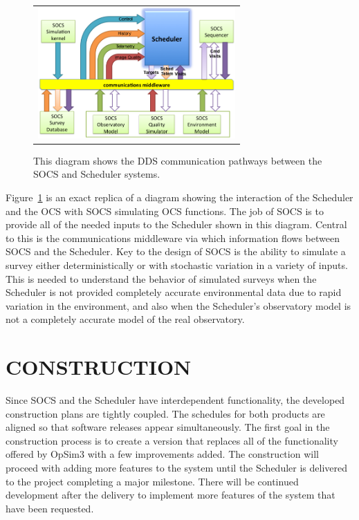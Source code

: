 \documentclass[]{spie}  %
\begin{document}
\begin{figure} [ht]
	\begin{center}
		\begin{tabular}{c}
			\includegraphics[height=5cm]{CommFlow.png}
		\end{tabular}
	\end{center}
	\caption[example]
	{ \label{fig:commflow} 
		This diagram shows the DDS communication pathways between the SOCS and Scheduler systems.}
\end{figure}

Figure~\ref*{fig:commflow} is an exact replica of a diagram showing the interaction of the Scheduler and the OCS with SOCS simulating OCS functions. The job of SOCS is to provide all of the needed inputs to the Scheduler shown in this diagram. Central to this is the communications middleware via which information flows between SOCS and the Scheduler. Key to the design of SOCS is the ability to simulate a survey either deterministically or with stochastic variation in a variety of inputs. This is needed to understand the behavior of simulated surveys when the Scheduler is not provided completely accurate environmental data due to rapid variation in the environment, and also when the Scheduler's observatory model is not a completely accurate model of the real observatory.

\section{CONSTRUCTION}
\label{sec:construction}

Since SOCS and the Scheduler have interdependent functionality, the developed construction plans are tightly coupled. The schedules for both products are aligned so that software releases appear simultaneously. The first goal in the construction process is to create a version that replaces all of the functionality offered by OpSim3 with a few improvements added. The construction will proceed with adding more features to the system until the Scheduler is delivered to the project completing a major milestone. There will be continued development after the delivery to implement more features of the system that have been requested. 
\end{document}
